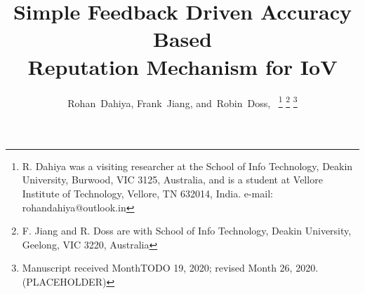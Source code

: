 \documentclass[journal]{IEEEtran}
\begin{document}
%
\title{Simple Feedback Driven Accuracy Based\\ Reputation Mechanism for IoV}
%
%
%
\author{Rohan~Dahiya,
        Frank~Jiang,
        and~Robin~Doss,~%
\thanks{R. Dahiya was a visiting researcher at the School of Info Technology, Deakin University, Burwood, VIC 3125, Australia, and is a student at Vellore Institute of Technology, Vellore, TN 632014, India. e-mail: rohandahiya@outlook.in}%
\thanks{F. Jiang and R. Doss are with School of Info Technology, Deakin University, Geelong, VIC 3220, Australia}%
\thanks{Manuscript received MonthTODO 19, 2020; revised Month 26, 2020.(PLACEHOLDER)}}

% 
%
\end{document}
